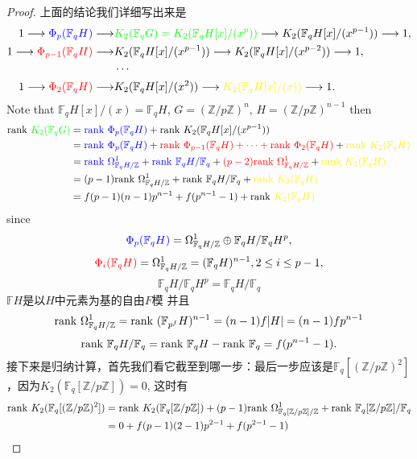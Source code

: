 \begin{proof}
上面的结论我们详细写出来是
\begin{align*}
1 \longrightarrow {\color{blue}{\color{blue} \Phi_p(\mathbb{F}_q H)}} \longrightarrow   &{\color{green}K_2( \mathbb{F}_q G)=K_2 (\mathbb{F}_q H[x]/(x^p))}  \longrightarrow K_2(\mathbb{F}_q H[x]/(x^{p-1})) \longrightarrow 1, \\
1 \longrightarrow {\color{red} \Phi_{p-1}(\mathbb{F}_q H)} \longrightarrow  &K_2 (\mathbb{F}_q H[x]/(x^{p-1}))  \longrightarrow K_2(\mathbb{F}_q H[x]/(x^{p-2})) \longrightarrow 1, \\
& \cdots \\
1 \longrightarrow {\color{red} \Phi_2(\mathbb{F}_q H)} \longrightarrow & K_2 (\mathbb{F}_q H[x]/(x^2))  \longrightarrow {\color{yellow} K_2(\mathbb{F}_q H[x]/(x))} \longrightarrow 1. \\
\end{align*}
Note that $\mathbb{F}_q H[x]/(x)=\mathbb{F}_q H$, $G=(\mathbb{Z}/p \mathbb{Z})^n$, $H=(\mathbb{Z}/p \mathbb{Z})^{n-1}$
then
\begin{align*}
\rank {\color{green}K_2 (\mathbb{F}_q G)} & = {\color{blue}\rank  \Phi_p(\mathbb{F}_q H)} + \rank K_2(\mathbb{F}_q H[x]/(x^{p-1})) \\
&= {\color{blue}\rank  \Phi_p(\mathbb{F}_q H)} + {\color{red} \rank \Phi_{p-1}(\mathbb{F}_q H) +\cdots +\rank \Phi_2(\mathbb{F}_q H)} +{\color{yellow} \rank K_2(\mathbb{F}_q H)}  \\
& ={\color{blue}\rank  \Omega^1_{\mathbb{F}_q H/\mathbb{Z}}} + {\color{blue}\rank  \mathbb{F}_q H/\mathbb{F}_q} + {\color{red} (p-2) \rank \Omega^1_{\mathbb{F}_q H/\mathbb{Z}}} + {\color{yellow} \rank K_2(\mathbb{F}_q H)}  \\
& = (p-1)\rank \Omega^1_{\mathbb{F}_q H/\mathbb{Z}} + \rank \mathbb{F}_q H/\mathbb{F}_q+ {\color{yellow} \rank K_2(\mathbb{F}_q H)}  \\
& = f(p-1)(n-1)p^{n-1} + f(p^{n-1}-1) +\rank  {\color{yellow} K_2(\mathbb{F}_q H)}
\end{align*}
since 
\[{\color{blue} \Phi_p(\mathbb{F}_q H)} = \Omega^1_{\mathbb{F}_q H/\mathbb{Z}} \oplus \mathbb{F}_q H/\mathbb{F}_q H^p,\]
\[ {\color{red}\Phi_i(\mathbb{F}_q H)} = \Omega^1_{\mathbb{F}_q H/\mathbb{Z}}= (\mathbb{F}_q H)^{n-1}, 2\leq i \leq p-1,\]
\[\mathbb{F}_q H/\mathbb{F}_q H^p= \mathbb{F}_q H/\mathbb{F}_q\] 
$\mathbb{F} H$是以$H$中元素为基的自由$F$模
并且
\[\mathrm{rank\ } \Omega^1_{\mathbb{F}_q H/\mathbb{Z}}= \mathrm{rank\ } (\mathbb{F}_{p^f} H)^{n-1} = (n-1)f|H|=(n-1)fp^{n-1}\]
\[\mathrm{rank\ } \mathbb{F}_q H/\mathbb{F}_q = \mathrm{rank\ } \mathbb{F}_q H- \mathrm{rank\ } \mathbb{F}_q = f(p^{n-1}-1).\]
接下来是归纳计算，首先我们看它截至到哪一步：最后一步应该是$\mathbb{F}_q[(\mathbb{Z}/p \mathbb{Z})^2]$，因为$K_2(\mathbb{F}_q[\mathbb{Z}/p \mathbb{Z}])=0$, 这时有
\begin{align*}
\mathrm{rank\ } K_2(\mathbb{F}_q[(\mathbb{Z}/p \mathbb{Z})^2])&=\mathrm{rank\ } K_2(\mathbb{F}_q[\mathbb{Z}/p \mathbb{Z}])+ (p- 1) \mathrm{rank\ } \Omega^1_{\mathbb{F}_q [\mathbb{Z}/p \mathbb{Z}]/\mathbb{Z}}+  \mathrm{rank\ } \mathbb{F}_q[\mathbb{Z}/p \mathbb{Z}]/\mathbb{F}_q\\
& = 0+f(p-1)(2-1)p^{2-1} +f(p^{2-1}-1)
\end{align*}


\end{proof}
